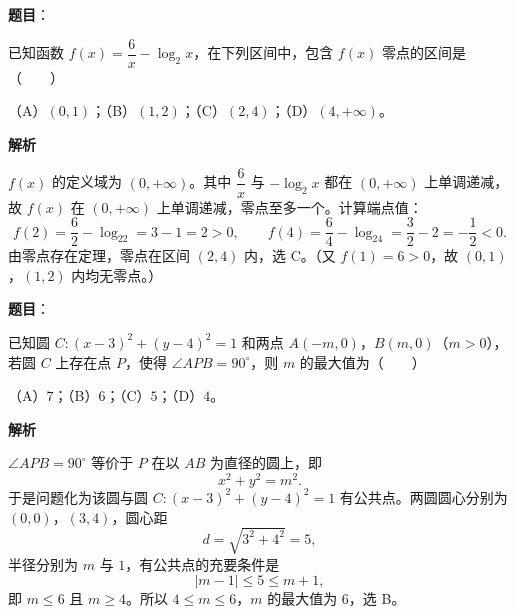 \begin{answer}

\textbf{题目}：

已知函数 $f(x)=\dfrac6x-\log_2x$，在下列区间中，包含 $f(x)$ 零点的区间是\mbox{（　　）}

（A）$(0,1)$；（B）$(1,2)$；（C）$(2,4)$；（D）$(4,+\infty)$。

\textbf{解析}

$f(x)$ 的定义域为 $(0,+\infty)$。其中 $\dfrac6x$ 与 $-\log_2x$ 都在 $(0,+\infty)$ 上单调递减，故 $f(x)$ 在 $(0,+\infty)$ 上单调递减，零点至多一个。计算端点值：
\nopagebreak[4]
\[f(2)=\frac62-\log_22=3-1=2>0,\qquad
f(4)=\frac64-\log_24=\frac32-2=-\frac12<0 .\]
由零点存在定理，零点在区间 $(2,4)$ 内，选 C。（又 $f(1)=6>0$，故 $(0,1)$，$(1,2)$ 内均无零点。）


\end{answer}
\begin{answer}

\textbf{题目}：

已知圆 $C:(x-3)^2+(y-4)^2=1$ 和两点 $A(-m,0)$，$B(m,0)$（$m>0$），若圆 $C$ 上存在点 $P$，使得 $\angle APB=90^\circ$，则 $m$ 的最大值为\mbox{（　　）}

（A）$7$；（B）$6$；（C）$5$；（D）$4$。

\textbf{解析}

$\angle APB=90^\circ$ 等价于 $P$ 在以 $AB$ 为直径的圆上，即
\nopagebreak[4]
\[x^2+y^2=m^2 .\]
于是问题化为该圆与圆 $C:(x-3)^2+(y-4)^2=1$ 有公共点。两圆圆心分别为 $(0,0)$，$(3,4)$，圆心距
\nopagebreak[4]
\[d=\sqrt{3^2+4^2}=5,\]
半径分别为 $m$ 与 $1$，有公共点的充要条件是
\nopagebreak[4]
\[|m-1|\leqslant 5\leqslant m+1,\]
即 $m\leqslant 6$ 且 $m\geqslant 4$。所以 $4\leqslant m\leqslant 6$，$m$ 的最大值为 $6$，选 B。


\end{answer}

